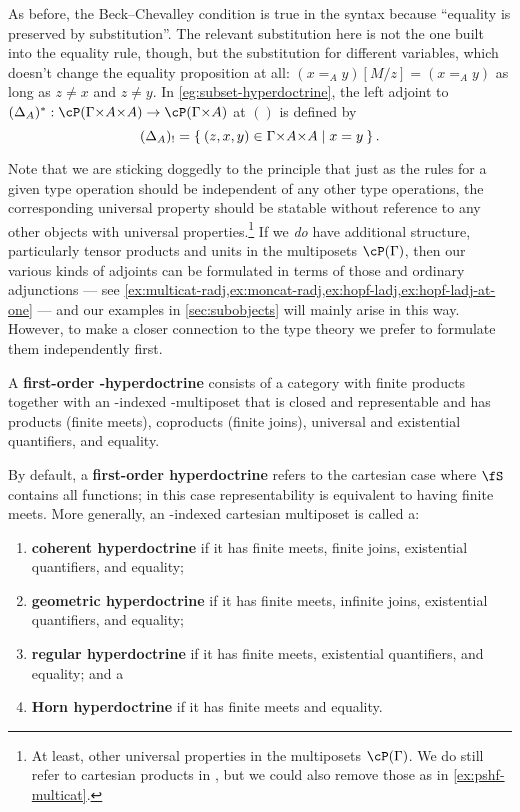 As before, the Beck--Chevalley condition is true in the syntax because ``equality is preserved by substitution''.
The relevant substitution here is not the one built into the equality rule, though, but the substitution for different variables, which doesn't change the equality proposition at all: $(x=_A y)[M/z] = (x=_A y)$ as long as $z\neq x$ and $z\neq y$.
In \cref{eg:subset-hyperdoctrine}, the left adjoint to $(\Delta_A)^* : \cP(\Gamma\times A\times A) \to \cP(\Gamma\times A)$ at $()$ is defined by
\[ (\Delta_A)_! = \setof{ (z,x,y)\in \Gamma\times A\times A | x=y }. \]

Note that we are sticking doggedly to the principle that just as the rules for a given type operation should be independent of any other type operations, the corresponding universal property should be statable without reference to any other objects with universal properties.\footnote{At least, other universal properties in the multiposets $\cP(\Gamma)$.
We do still refer to cartesian products in \cS, but we could also remove those as in \cref{ex:pshf-multicat}.}
If we \emph{do} have additional structure, particularly tensor products and units in the multiposets $\cP(\Gamma)$, then our various kinds of adjoints can be formulated in terms of those and ordinary adjunctions --- see \cref{ex:multicat-radj,ex:moncat-radj,ex:hopf-ladj,ex:hopf-ladj-at-one} --- and our examples in \cref{sec:subobjects} will mainly arise in this way.
However, to make a closer connection to the type theory we prefer to formulate them independently first.

\begin{defn}
  A \textbf{first-order \fS-hyperdoctrine} consists of a category \cS with finite products together with an \cS-indexed \fS-multiposet that is closed and representable and has products (finite meets), coproducts (finite joins), universal and existential quantifiers, and equality.

  By default, a \textbf{first-order hyperdoctrine} refers to the cartesian case where $\fS$ contains all functions; in this case representability is equivalent to having finite meets.
  More generally, an \cS-indexed cartesian multiposet is called a:
  \begin{enumerate}
  \item \textbf{coherent hyperdoctrine} if it has finite meets, finite joins, existential quantifiers, and equality;
  \item \textbf{geometric hyperdoctrine} if it has finite meets, infinite joins, existential quantifiers, and equality;
  \item \textbf{regular hyperdoctrine} if it has finite meets, existential quantifiers, and equality; and a
  \item \textbf{Horn hyperdoctrine} if it has finite meets and equality.
  \end{enumerate}
\end{defn}

